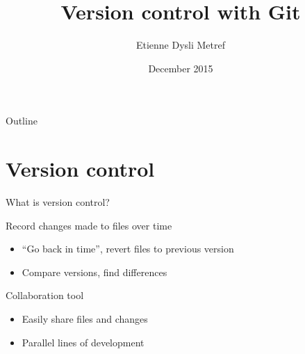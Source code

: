 \documentclass{beamer}
\title{Version control with Git}
\author{Etienne Dysli Metref}
\date{December 2015}
\begin{document}
\begin{frame}
  \titlepage
\end{frame}

\begin{frame}{Outline}
  \tableofcontents[hideallsubsections]
\end{frame}

\section{Version control}
\begin{frame}{What is version control?}
  \begin{block}{Record changes made to files over time}
    \begin{itemize}
    \item ``Go back in time'', revert files to previous version
    \item Compare versions, find differences
    \end{itemize}
  \end{block}
  \begin{block}{Collaboration tool}
    \begin{itemize}
    \item Easily share files and changes
    \item Parallel lines of development
    \end{itemize}
  \end{block}
\end{frame}
\end{document}
